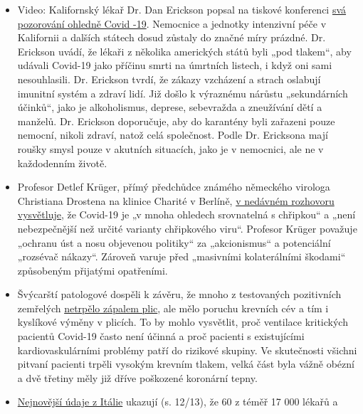 \begin{itemize}
\tightlist
\item
  Video: Kalifornský lékař Dr. Dan Erickson popsal na tiskové konferenci
  \href{https://www.turnto23.com/news/coronavirus/video-interview-with-dr-dan-erickson-and-dr-artin-massihi-taken-down-from-youtube}{svá
  pozorování ohledně Covid -19}. Nemocnice a jednotky intenzivní péče v
  Kalifornii a dalších státech dosud zůstaly do značné míry prázdné. Dr.
  Erickson uvádí, že lékaři z několika amerických států byli „pod
  tlakem``, aby udávali Covid-19 jako příčinu smrti na úmrtních listech,
  i když oni sami nesouhlasili. Dr. Erickson tvrdí, že zákazy vzcházení
  a strach oslabují imunitní systém a zdraví lidí. Již došlo k výraznému
  nárůstu „sekundárních účinků``, jako je alkoholismus, deprese,
  sebevražda a zneužívání dětí a manželů. Dr. Erickson doporučuje, aby
  do karantény byli zařazeni pouze nemocní, nikoli zdraví, natož celá
  společnost. Podle Dr. Ericksona mají roušky smysl pouze v akutních
  situacích, jako je v nemocnici, ale ne v každodenním životě.
\item
  Profesor Detlef Krüger, přímý předchůdce známého německého virologa
  Christiana Drostena na klinice Charité v Berlíně,
  \href{https://de.sputniknews.com/interviews/20200425326953541-corona-gefahr-virologe/}{v
  nedávném rozhovoru vysvětluje}, že Covid-19 je „v mnoha ohledech
  srovnatelná s chřipkou`` a „není nebezpečnější než určité varianty
  chřipkového viru``. Profesor Krüger považuje „ochranu úst a nosu
  objevenou politiky`` za „akcionismus`` a potenciální „rozsévač
  nákazy``. Zároveň varuje před „masivními kolaterálními škodami``
  způsobeným přijatými opatřeními.
\item
  Švýcarští patologové dospěli k závěru, že mnoho z testovaných
  pozitivních zemřelých
  \href{https://www.welt.de/wissenschaft/article207417811/Corona-Tote-In-den-wenigsten-Faellen-eine-Lungenentzuendung.html}{netrpělo
  zápalem plic}, ale mělo poruchu krevních cév a tím i kyslíkové výměny
  v plicích. To by mohlo vysvětlit, proč ventilace kritických pacientů
  Covid-19 často není účinná a proč pacienti s existujícími
  kardiovaskulárními problémy patří do rizikové skupiny. Ve skutečnosti
  všichni pitvaní pacienti trpěli vysokým krevním tlakem, velká část
  byla vážně obézní a dvě třetiny měly již dříve poškozené koronární
  tepny.
\item
  \href{https://www.epicentro.iss.it/coronavirus/bollettino/Bollettino-sorveglianza-integrata-COVID-19_16-aprile-2020.pdf\#page=13}{Nejnovější
  údaje z Itálie} ukazují (s. 12/13), že 60 z téměř 17 000 lékařů a

\end{itemize}
